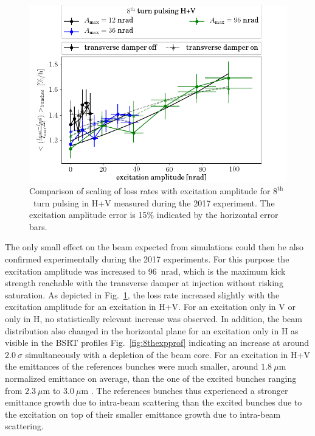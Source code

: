 \documentclass[%
 reprint,
 amsmath,amssymb,
 aps,
prstab,
]{revtex4-1}
\begin{document}
\begin{figure}[h]
	\centering
	\includegraphics[width=1.0\linewidth]{2017_scale_amp_8hv_lbllong.png}
	\caption{\label{fig:8thexploss} Comparison of scaling of loss rates with excitation amplitude for $8^{\mathrm{th}}$~turn pulsing in H+V measured during the 2017 experiment. The excitation amplitude error is 15\% indicated by the horizontal error bars.}
\end{figure}
The only small effect on the beam expected from simulations could then be also confirmed experimentally during the 2017 experiments. For this purpose the excitation amplitude was increased to 96~nrad, which is the maximum kick strength reachable with the transverse damper at injection without risking saturation. As depicted in Fig.~\ref{fig:8thexploss}, the loss rate increased slightly with the excitation amplitude for an excitation in H+V. For an excitation only in V or only in H, no statistically relevant increase was observed. In addition, the beam distribution also changed in the horizontal plane for an excitation only in H as visible in the BSRT profiles Fig.~\ref{fig:8thexpprof} indicating an increase at around $2.0~\sigma$ simultaneously with a depletion of the beam core. For an excitation in H+V the emittances of the references bunches were much smaller, around $1.8~\mu$m normalized emittance on average, than the one of the excited bunches ranging from $2.3~\mu$m to $3.0~\mu$m \cite{resexmd2017}. The references bunches thus experienced a stronger emittance growth due to intra-beam scattering than the excited bunches due to the excitation on top of their smaller emittance growth due to intra-beam scattering. 
\end{document}
